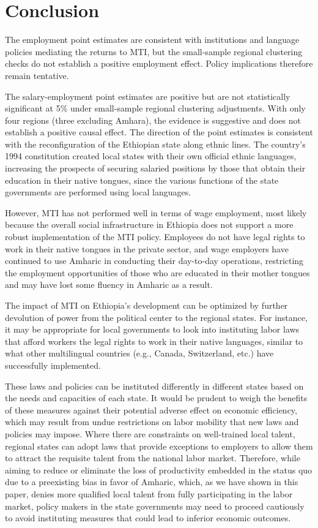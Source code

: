 
\section{Conclusion}

The employment point estimates are consistent with institutions and language policies mediating the returns to MTI, but the small-sample regional clustering checks do not establish a positive employment effect. Policy implications therefore remain tentative.

The salary-employment point estimates are positive but are not statistically significant at 5\% under small-sample regional clustering adjustments. With only four regions (three excluding Amhara), the evidence is suggestive and does not establish a positive causal effect. The direction of the point estimates is consistent with the reconfiguration of the Ethiopian state along ethnic lines. The country's 1994 constitution created local states with their own official ethnic languages, increasing the prospects of securing salaried positions by those that obtain their education in their native tongues, since the various functions of the state governments are performed using local languages.

However, MTI has not performed well in terms of wage employment, most likely because the overall social infrastructure in Ethiopia does not support a more robust implementation of the MTI policy. Employees do not have legal rights to work in their native tongues in the private sector, and wage employers have continued to use Amharic in conducting their day-to-day operations, restricting the employment opportunities of those who are educated in their mother tongues and may have lost some fluency in Amharic as a result. 

The impact of MTI on Ethiopia’s development can be optimized by further devolution of power from the political center to the regional states. For instance, it may be appropriate for local governments to look into instituting labor laws that afford workers the legal rights to work in their native languages, similar to what other multilingual countries (e.g., Canada, Switzerland, etc.) have successfully implemented. 

These laws and policies can be instituted differently in different states based on the needs and capacities of each state. It would be prudent to weigh the benefits of these measures against their potential adverse effect on economic efficiency, which may result from undue restrictions on labor mobility that new laws and policies may impose. Where there are constraints on well-trained local talent, regional states can adopt laws that provide exceptions to employers to allow them to attract the requisite talent from the national labor market. Therefore, while aiming to reduce or eliminate the loss of productivity embedded in the status quo due to a preexisting bias in favor of Amharic, which, as we have shown in this paper, denies more qualified local talent from fully participating in the labor market, policy makers in the state governments may need to proceed cautiously to avoid instituting measures that could lead to inferior economic outcomes.
